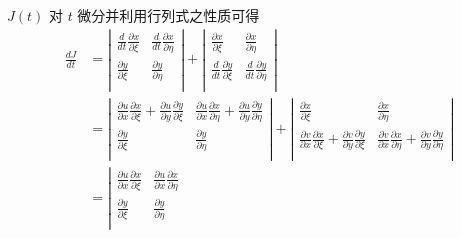 \documentclass[11pt]{article}
\begin{document}
$ J\left(t\right) $ 对 $ t $ 微分并利用行列式之性质可得
\begin{equation}
\begin{split}
\frac{{dJ}}{{dt}} & = \left| {\begin{matrix}
	{\frac{d}{{dt}}\frac{{\partial x}}{{\partial \xi }}} & {\frac{d}{{dt}}\frac{{\partial x}}{{\partial \eta }}}  \\ 
	{\frac{{\partial y}}{{\partial \xi }}} & {\frac{{\partial y}}{{\partial \eta }}}  \\ 
	\end{matrix} } \right| + \left| {\begin{matrix}
	{\frac{{\partial x}}{{\partial \xi }}} & {\frac{{\partial x}}{{\partial \eta }}}  \\ 
	{\frac{d}{{dt}}\frac{{\partial y}}{{\partial \xi }}} & {\frac{d}{{dt}}\frac{{\partial y}}{{\partial \eta }}}  \\ 
	\end{matrix} } \right| \\
				 & = \left| {\begin{matrix}
				 	{\frac{{\partial u}}{{\partial x}}\frac{{\partial x}}{{\partial \xi }} + \frac{{\partial u}}{{\partial y}}\frac{{\partial y}}{{\partial \xi }}} & {\frac{{\partial u}}{{\partial x}}\frac{{\partial x}}{{\partial \eta }} + \frac{{\partial u}}{{\partial y}}\frac{{\partial y}}{{\partial \eta }}}  \\ 
				 	{\frac{{\partial y}}{{\partial \xi }}} & {\frac{{\partial y}}{{\partial \eta }}}  \\ 
				 	\end{matrix} } \right| + \left| {\begin{matrix}
				 	{\frac{{\partial x}}{{\partial \xi }}} & {\frac{{\partial x}}{{\partial \eta }}}  \\ 
				 	{\frac{{\partial v}}{{\partial x}}\frac{{\partial x}}{{\partial \xi }} + \frac{{\partial v}}{{\partial y}}\frac{{\partial y}}{{\partial \xi }}} & {\frac{{\partial v}}{{\partial x}}\frac{{\partial x}}{{\partial \eta }} + \frac{{\partial v}}{{\partial y}}\frac{{\partial y}}{{\partial \eta }}}  \\ 
				 	\end{matrix} } \right|\\
			 	& = \left| {\begin{matrix}
			 		{\frac{{\partial u}}{{\partial x}}\frac{{\partial x}}{{\partial \xi }}} & {\frac{{\partial u}}{{\partial x}}\frac{{\partial x}}{{\partial \eta }}}  \\ 
			 		{\frac{{\partial y}}{{\partial \xi }}} & {\frac{{\partial y}}{{\partial \eta }}}  \\ 

\end{matrix}}
\end{split}
\end{equation}
\end{document}
